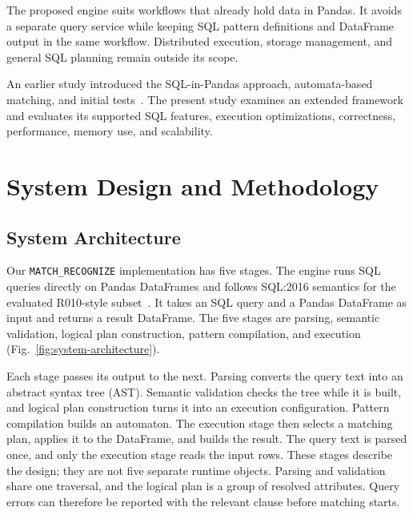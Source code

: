 \documentclass[preprint,12pt,times,a4paper]{elsarticle}
\begin{document}
The proposed engine suits workflows that already hold data in Pandas. It
avoids a separate query service while keeping SQL pattern definitions and
DataFrame output in the same workflow. Distributed execution, storage
management, and general SQL planning remain outside its scope.

An earlier study introduced the SQL-in-Pandas approach, automata-based
matching, and initial tests~\cite{lawande2026rpr}. The present study examines
an extended framework and evaluates its supported SQL features, execution
optimizations, correctness, performance, memory use, and scalability.


\FloatBarrier
\section{System Design and Methodology}

\subsection{System Architecture}

Our \texttt{MATCH\_RECOGNIZE} implementation has five stages. The engine runs SQL queries directly on Pandas DataFrames and follows SQL:2016 semantics for the evaluated R010-style subset~\cite{iso9075_2_2016,ISO2021,michels2018new}. It takes an SQL query and a Pandas DataFrame as input and returns a result DataFrame. The five stages are parsing, semantic validation, logical plan construction, pattern compilation, and execution (Fig.~\ref{fig:system-architecture}).

Each stage passes its output to the next. Parsing converts the query text into
an abstract syntax tree (AST). Semantic validation checks the tree while it is
built, and logical plan construction turns it into an execution configuration.
Pattern compilation builds an automaton. The execution stage then selects a
matching plan, applies it to the DataFrame, and builds the result. The query
text is parsed once, and only the execution stage reads the input rows. These
stages describe the design; they are not five separate runtime objects.
Parsing and validation share one traversal, and the logical plan is a group of
resolved attributes. Query errors can therefore be reported with the relevant
clause before matching starts.
\end{document}
